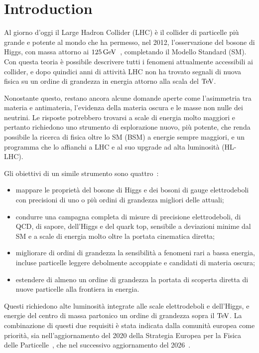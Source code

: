 \chapter{Introduction}
\label{ch:introduction}

Al giorno d'oggi il Large Hadron Collider (LHC) è il collider di particelle più grande e potente al mondo che ha permesso, nel 2012, l'osservazione del bosone di Higgs, con massa attorno ai $125\,\mathrm{GeV}$~\cite{ATLAS:2012Higgs,CMS:2012Higgs}, completando il Modello Standard (SM). Con questa teoria è possibile descrivere tutti i fenomeni attualmente accessibili ai collider, e dopo quindici anni di attività LHC non ha trovato segnali di nuova fisica su un ordine di grandezza in energia attorno alla scala del $\mathrm{TeV}$.

Nonostante questo, restano ancora alcune domande aperte come l'asimmetria tra materia e antimateria, l'evidenza della materia oscura e le masse non nulle dei neutrini. Le risposte potrebbero trovarsi a scale di energia molto maggiori e pertanto richiedono uno strumento di esplorazione nuovo, più potente, che renda possibile la ricerca di fisica oltre lo SM (BSM) a energie sempre maggiori, e un programma che lo affianchi a LHC e al suo upgrade ad alta luminosità (HL-LHC).

Gli obiettivi di un simile strumento sono quattro~\cite{FCC:FSR-v1}:
\begin{itemize}
    \item mappare le proprietà del bosone di Higgs e dei bosoni di gauge elettrodeboli con precisioni di uno o più ordini di grandezza migliori delle attuali;
    \item condurre una campagna completa di misure di precisione elettrodeboli, di QCD, di sapore, dell'Higgs e del quark top, sensibile a deviazioni minime dal SM e a scale di energia molto oltre la portata cinematica diretta;
    \item migliorare di ordini di grandezza la sensibilità a fenomeni rari a bassa energia, incluse particelle leggere debolmente accoppiate e candidati di materia oscura;
    \item estendere di almeno un ordine di grandezza la portata di scoperta diretta di nuove particelle alla frontiera in energia.
\end{itemize}
Questi richiedono alte luminosità integrate alle scale elettrodeboli e dell'Higgs, e energie del centro di massa partonico un ordine di grandezza sopra il $\mathrm{TeV}$. La combinazione di questi due requisiti è stata indicata dalla comunità europea come priorità, sia nell'aggiornamento del 2020 della Strategia Europea per la Fisica delle Particelle~\cite{ESPP:2020}, che nel successivo aggiornamento del 2026~\cite{ESPP:2026}. 

